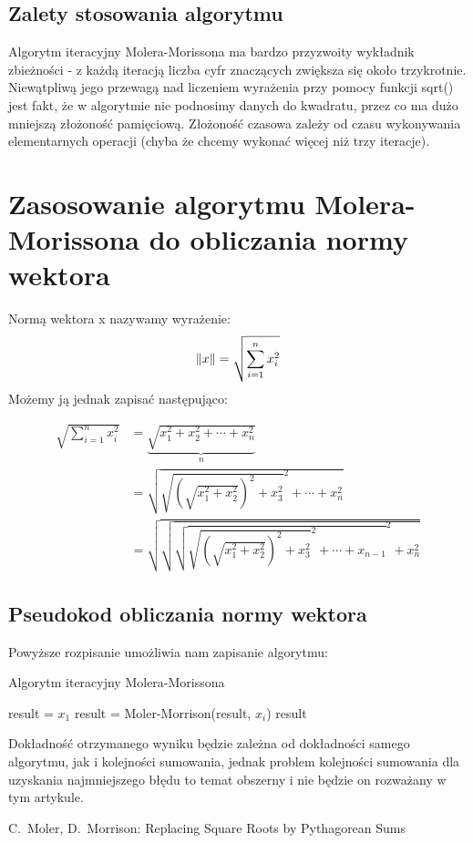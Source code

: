 \documentclass{article}
\begin{document}
        \subsection{Zalety stosowania algorytmu}
	    \indent Algorytm iteracyjny Molera-Morissona ma bardzo przyzwoity wykładnik zbieżności - z każdą iteracją liczba cyfr znaczących
	    zwiększa się około trzykrotnie. Niewątpliwą jego przewagą nad liczeniem wyrażenia przy pomocy funkcji sqrt() jest fakt, że w algorytmie
	    nie podnosimy danych do kwadratu, przez co ma dużo mniejszą złożoność pamięciową. Złożoność czasowa zależy od czasu wykonywania elementarnych
	    operacji (chyba że chcemy wykonać więcej niż trzy iteracje).
	    
	    
    \section{Zasosowanie algorytmu Molera-Morissona do obliczania normy wektora}
        \indent Normą wektora x nazywamy wyrażenie:
	\[\Arrowvert x \Arrowvert = \sqrt{\sum_{i=1}^{n}x_i^2}\]
	Możemy ją jednak zapisać następująco:
	
	\begin{equation}
	  \begin{split}
	    \sqrt{\sum_{i=1}^{n}x_i^2} &= \underbrace{\sqrt{x_1^2 + x_2^2 + \cdots + x_n^2}}_{n}\\ &= \sqrt{\sqrt{(\sqrt{x_1^2 + x_2^2})^2 + x_3^2}^2 +
	      \cdots + x_n^2}\\ &= \sqrt{\sqrt{\sqrt{\sqrt{(\sqrt{x_1^2 + x_2^2})^2 + x_3^2}^2 +
		  \cdots + x_{n-1}}^2 + x_n^2}} 
	  \end{split}
	\end{equation}
        
	\subsection{Pseudokod obliczania normy wektora}
	
	   \indent Powyższe rozpisanie umożliwia nam zapisanie algorytmu:
	   \begin{algorithm}
            \caption{Algorytm iteracyjny Molera-Morissona}
                \begin{algorithmic}
		  \STATE result = $x_1$
		      \STATE result = Moler-Morrison(result, $x_i$)
		  \ENDFOR
		  \RETURN result
                \end{algorithmic}        
            \end{algorithm}
	    
	    Dokładność otrzymanego wyniku będzie zależna od dokładności samego algorytmu, jak i kolejności sumowania, 
	    jednak problem kolejności sumowania dla uzyskania najmniejszego błędu to temat obszerny i nie będzie on rozważany
	    w tym artykule.
            \par
	   
	    \begin{thebibliography}{99}
	       C.~Moler, D.~Morrison: Replacing Square Roots by Pythagorean Sums
	    \end{thebibliography}
\end{document}
